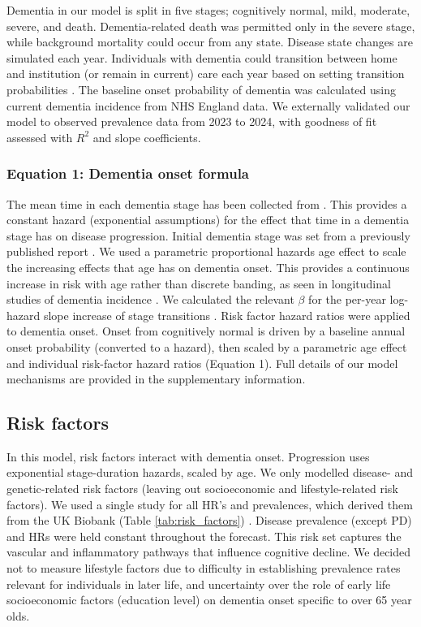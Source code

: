 \documentclass[11pt,a4paper]{article}
\begin{document}
Dementia in our model is split in five stages; cognitively normal, mild, moderate, severe, and death. Dementia-related death was permitted only in the severe stage, while background mortality could occur from any state. Disease state changes are simulated each year. Individuals with dementia could transition between home and institution (or remain in current) care each year based on setting transition probabilities \cite{ref26}. The baseline onset probability of dementia was calculated using current dementia incidence from NHS England data. We externally validated our model to observed prevalence data from 2023 to 2024, with goodness of fit assessed with $R^2$ and slope coefficients.

\subsubsection{Equation 1: Dementia onset formula}

The mean time in each dementia stage has been collected from \cite{ref27}. This provides a constant hazard (exponential assumptions) for the effect that time in a dementia stage has on disease progression. Initial dementia stage was set from a previously published report \cite{ref26}. We used a parametric proportional hazards age effect to scale the increasing effects that age has on dementia onset. This provides a continuous increase in risk with age rather than discrete banding, as seen in longitudinal studies of dementia incidence \cite{ref28}. We calculated the relevant $\beta$ for the per-year log-hazard slope increase of stage transitions \cite{ref29,ref30,ref31}. Risk factor hazard ratios were applied to dementia onset. Onset from cognitively normal is driven by a baseline annual onset probability (converted to a hazard), then scaled by a parametric age effect and individual risk-factor hazard ratios (Equation 1). Full details of our model mechanisms are provided in the supplementary information.

\subsection{Risk factors}

In this model, risk factors interact with dementia onset. Progression uses exponential stage-duration hazards, scaled by age. We only modelled disease- and genetic-related risk factors (leaving out socioeconomic and lifestyle-related risk factors). We used a single study for all HR's and prevalences, which derived them from the UK Biobank (Table \ref{tab:risk_factors}) \cite{ref32}. Disease prevalence (except PD) and HRs were held constant throughout the forecast. This risk set captures the vascular and inflammatory pathways that influence cognitive decline. We decided not to measure lifestyle factors due to difficulty in establishing prevalence rates relevant for individuals in later life, and uncertainty over the role of early life socioeconomic factors (education level) on dementia onset specific to over 65 year olds.
\end{document}
